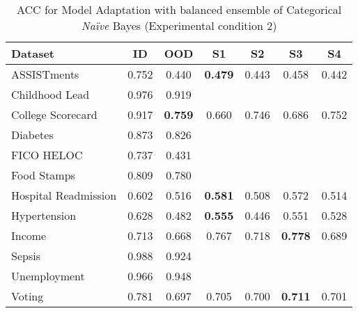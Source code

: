 \begin{table}
\centering
\caption{ACC for Model Adaptation with balanced ensemble of Categorical \textit{Na\"ive} Bayes (Experimental condition 2)}
\begin{tabular}{lcccccc}
\toprule
{Dataset} & {ID} & {OOD} & {S1} & {S2} & {S3} & {S4} \\
\midrule
ASSISTments & 0.752 & 0.440 & \bfseries 0.479 & 0.443 & 0.458 & 0.442 \\
Childhood Lead & 0.976 & 0.919 &  &  &  &  \\
College Scorecard & 0.917 & \bfseries 0.759 & 0.660 & 0.746 & 0.686 & 0.752 \\
Diabetes & 0.873 & 0.826 &  &  &  &  \\
FICO HELOC & 0.737 & 0.431 &  &  &  &  \\
Food Stamps & 0.809 & 0.780 &  &  &  &  \\
Hospital Readmission & 0.602 & 0.516 & \bfseries 0.581 & 0.508 & 0.572 & 0.514 \\
Hypertension & 0.628 & 0.482 & \bfseries 0.555 & 0.446 & 0.551 & 0.528 \\
Income & 0.713 & 0.668 & 0.767 & 0.718 & \bfseries 0.778 & 0.689 \\
Sepsis & 0.988 & 0.924 &  &  &  &  \\
Unemployment & 0.966 & 0.948 &  &  &  &  \\
Voting & 0.781 & 0.697 & 0.705 & 0.700 & \bfseries 0.711 & 0.701 \\
\bottomrule
\end{tabular}
\end{table}

